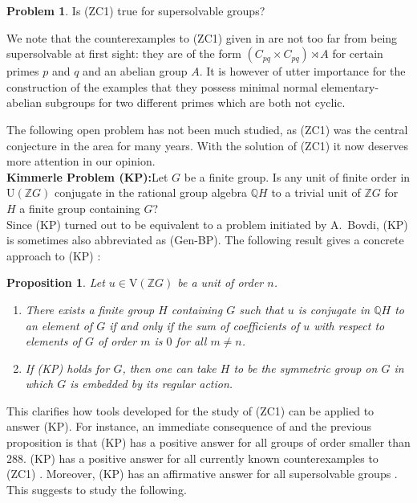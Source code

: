 \documentclass[10pt,a4paper,reqno]{amsart}
\newtheorem{proposition}[theorem]{Proposition}
\theoremstyle{definition}
\newtheorem{problem}[theorem]{Problem}
\theoremstyle{remark}
\newcommand{\U}{\mathrm{U}}
\newcommand{\V}{\mathrm{V}}
\newcommand{\ZZ}{\mathbb{Z}}
\newcommand{\QQ}{\mathbb{Q}}
\begin{document}
\begin{problem} Is (ZC1) true for supersolvable groups?\end{problem} 

We note that the counterexamples to (ZC1) given in \cite{EM18} are not too far from being supersolvable at first sight: they are of the form $(C_{pq} \times C_{pq}) \rtimes A$ for certain primes $p$ and $q$ and an abelian group $A$. It is however of utter importance for the construction of the examples that they possess minimal normal elementary-abelian subgroups for two different primes which are both not cyclic.

The following open problem has not been much studied, as (ZC1) was the central conjecture in the area for many years. With the solution of (ZC1) it now deserves more attention in our opinion.\\

\noindent\textbf{Kimmerle Problem (KP):}\quad Let $G$ be a finite group. Is any unit of finite order in $\U(\ZZ G)$ conjugate in the rational group algebra $\QQ H$ to a trivial unit of $\ZZ G$ for $H$ a finite group containing $G$? \\

Since (KP) turned out to be equivalent to a problem initiated by A.~Bovdi, (KP) is sometimes also abbreviated as (Gen-BP).
The following result gives a concrete approach to (KP) \cite[Proposition 2.1 and its proof]{MdR19}:

\begin{proposition} Let $u \in \V(\ZZ G)$ be a unit of order $n$.
\begin{enumerate}
\item There exists a finite group $H$ containing $G$ such that $u$ is conjugate in $\QQ H$ to an element of $G$ if and only if the sum of coefficients of $u$ with respect to elements of $G$ of order $m$ is $0$ for all $m \neq n$.
\item If (KP) holds for $G$, then one can take $H$ to be the symmetric group on $G$ in which $G$ is embedded by its regular action.
\end{enumerate}
\end{proposition}

This clarifies how tools developed for the study of (ZC1) can be applied to answer (KP). For instance, an immediate consequence of \cite{BHKMS18} and the previous proposition is that (KP) has a positive answer for all groups of order smaller than $288$. (KP) has a positive answer for all currently known counterexamples to (ZC1) \cite[Remark~3.4]{BKS20}. Moreover, (KP) has an affirmative answer for all supersolvable groups \cite[Theorem~3.6]{BKS20}. This suggests to study the following.
\end{document}
